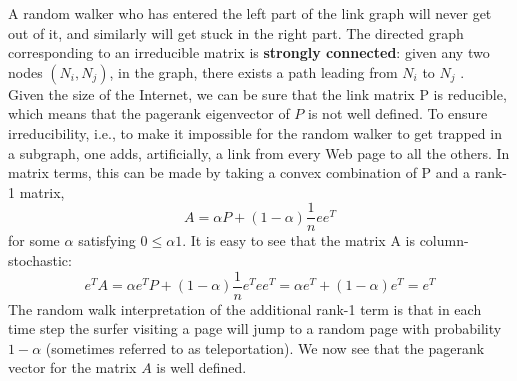 \documentclass[a4paper]{article}
\begin{document}
\begin{center}

\end{center}
A random walker who has entered the left part of the link graph will never get
out of it, and similarly will get stuck in the right part.
The directed graph corresponding to an irreducible matrix is \textbf{strongly connected}:
given any two nodes $(N_i,N_j )$, in the graph, there exists a path leading
from $N_i$ to $N_j$ .\\

Given the size of the Internet, we can be sure that the link matrix P is reducible,
which means that the pagerank eigenvector of $P$ is not well defined. To
ensure irreducibility, i.e., to make it impossible for the random walker to get trapped
in a subgraph, one adds, artificially, a link from every Web page to all the others. In
matrix terms, this can be made by taking a convex combination of P and a rank-1
matrix,
$$A = \alpha P + (1- \alpha)\frac{1}{n}ee^T$$
for some $\alpha$ satisfying $0 \leq \alpha 1$. It is easy to see that the matrix A is column-stochastic:
$$e^TA = \alpha e^TP + (1 − \alpha)\frac{1}{n}e^T ee^T = \alpha e^T + (1 − \alpha)e^T = e^T$$
The random walk interpretation of the additional rank-1 term is that in each time
step the surfer visiting a page will jump to a random page with probability $1 − \alpha$
(sometimes referred to as teleportation).
We now see that the pagerank vector for the matrix $A$ is well defined.
\end{document}
